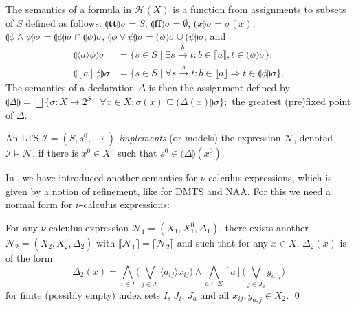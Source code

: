 \documentclass[twocolumn]{svjour3-dummy}
\newcommand*\impl[1]{\llbracket #1\rrbracket}
\newcommand*\cI{\mathcal I}
\newcommand*{\must}[1]{\overset{#1}{\longrightarrow}}
\newcommand*{\omust}{\mathord{\must{}}}
\newcommand*\NAA{NAA\xspace}
\newcommand*\noproof{\qed}
\newcommand*\HML{\mathcal{H}}
\newcommand*\ttt{\mathbf{t\!t}}
\newcommand*\fff{\mathbf{ff}}
\newcommand*\cN{\mathcal N}
\newcommand*\lsem[1]{\llparenthesis #1\rrparenthesis}
\newcommand*\IMPL{\mathrel{\Longrightarrow}}
\newcommand*\sem[1]{\llbracket #1\rrbracket}
\newcommand*\bigland{\bigwedge}
\newcommand*\biglor{\bigvee}
\begin{document}
The semantics of a formula in $\HML( X)$ is a function from
assignments to subsets of $S$ defined as follows: $\lsem \ttt \sigma=
S$, $\lsem \fff \sigma= \emptyset$, $\lsem x \sigma= \sigma( x)$,
$\lsem{ \phi\land \psi} \sigma= \lsem \phi\sigma\cap \lsem \psi
\sigma$, $\lsem{ \phi\lor \psi} \sigma= \lsem \phi\sigma\cup \lsem
\psi \sigma$, and
\begin{align*}
  \lsem{\langle a\rangle \phi} \sigma &= \{ s\in S\mid \exists s\must b
  t: b \in \impl{a}, t\in \lsem \phi \sigma\}, \\
  \lsem{[ a] \phi} \sigma &= \{ s\in S\mid \forall s\must b t: b \in
  \impl{a} \IMPL t\in \lsem \phi \sigma\}.
\end{align*} 
The semantics of a declaration $\Delta$ is then the assignment defined
by
$\lsem \Delta= \bigsqcup\{ \sigma: X\to 2^S\mid \forall x\in X:
\sigma( x)\subseteq \lsem{ \Delta( x)} \sigma\};$
the greatest (pre)fixed point of $\Delta$.

An LTS $\cI=( S, s^0, \omust)$ \emph{implements} (or models) the
expression $\cN$, denoted $\cI\models \cN$, if there is $x^0\in X^0$
such that $s^0\in \lsem \Delta( x^0)$.

In~\cite{DBLP:conf/ictac/FahrenbergLT14} we have introduced another
semantics for $\nu$-calculus expressions, which is given by a notion of
refinement, like for DMTS and \NAA.  For this we need a normal form for
$\nu$-calculus expressions:

\begin{lemma}
  \label{le:hmlnormal}
  For any $\nu$-calculus expression $\cN_1=( X_1, X^0_1, \Delta_1)$,
  there exists another $\cN_2=( X_2, X^0_2, \Delta_2)$ with
  $\sem{ \cN_1}= \sem{ \cN_2}$ and such that for any $x\in X$,
  $\Delta_2( x)$ is of the form
  \begin{equation*}
    \Delta_2( x)= \bigland_{ i\in I}\big( \biglor_{ j\in
      J_i} \langle a_{ ij}\rangle  x_{ ij}\big)\land \bigland_{ a\in
      \Sigma}[ a] \big( \biglor_{ j\in J_a} y_{ a, j}\big)
  \end{equation*}
  for finite (possibly empty) index sets $I$, $J_i$, $J_a$ and all $x_{
    ij}, y_{ a, j}\in X_2$.  \noproof
\end{lemma}
\end{document}
